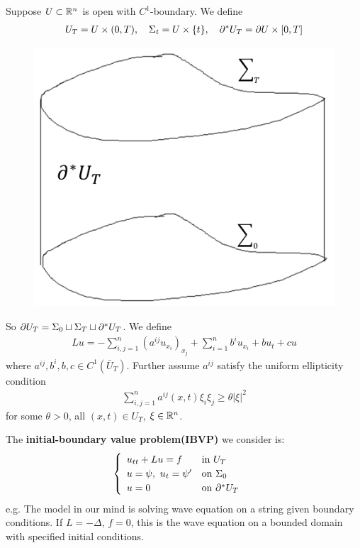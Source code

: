 \documentclass[12pt,a4paper]{report}
\begin{document}
Suppose $U\subset \mathbb{R}^n$ is open with $C^1$-boundary. We define 
\begin{align*}
U_T = U \times (0,T), \quad \Sigma_t = U \times \{t \}, \quad \partial^* U_T = \partial U \times [0,T]
\end{align*}
\begin{figure}[h]
	\begin{center}
		\includegraphics[scale=0.33]{9}
	\end{center}
\end{figure}
So $\partial U_T = \Sigma_0 \sqcup \Sigma_T \sqcup \partial^* U_T$. We define
\begin{align*}
Lu = -\sum_{i,j=1}^n (a^{ij}u_{x_i})_{x_j} + \sum_{i=1}^n b^i u_{x_i} + bu_t + cu
\end{align*}
where $a^{ij}, b^i, b,c \in C^1(\bar{U}_T)$. Further assume $a^{ij}$ satisfy the uniform ellipticity condition
\begin{align*}
\sum_{i,j=1}^n a^{ij}(x,t) \xi_i \xi_j \geq \theta |\xi|^2
\end{align*}
for some $\theta >0$, all $(x,t)\in U_T$, $\xi \in \mathbb{R}^n$.

\quad The \textbf{initial-boundary value problem(IBVP)} we consider is:
\begin{align}
\begin{cases}
\begin{array}{ll}
u_{tt} + Lu = f & \text{in } U_T \\
u = \psi, \,\, u_t = \psi' & \text{on } \Sigma_0\\
u = 0 & \text{on } \partial^* U_T
\end{array}
\end{cases} \label{31}
\end{align}
e.g. The model in our mind is solving wave equation on a string given boundary conditions. If $L = - \Delta$, $f=0$, this is the wave equation on a bounded domain with specified initial conditions.
\s
\end{document}

